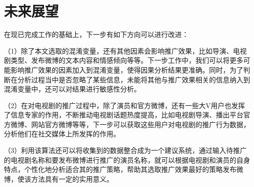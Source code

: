 \section{未来展望}

在现已完成工作的基础上，下一步有如下方向可以进行改进：

（1）除了本文选取的混淆变量，还有其他因素会影响推广效果，比如导演、电视剧类型、发布微博的文本内容和情感倾向等等。下一步工作中，我们可以将更多可能影响推广效果的因素加入到混淆变量，使得因果分析结果更准确。同时，为了判断在分析过程当中是否忽略了某些信息，未能将其他与推广效果相关的信息纳入到混淆变量中，还可以对结果进行敏感性分析。

（2）在对电视剧的推广过程中，除了演员和官方微博，还有一些大V用户也发挥了信息专家的作用，不断推动电视剧话题热度提高，比如电视剧导演、播出平台官方微博、网站官方微博等等，下一步可以获取这些用户对电视剧的推广行为数据，分析他们在社交媒体上所发挥的作用。

（3）利用该算法还可以将收集到的数据整合成为一个建议系统，通过输入待推广的电视剧名称和要发布微博进行推广的演员名称，就可以根据电视剧和演员的自身特点，个性化地分析适合其的推广策略，帮助其选取推广效果最好的策略发布微博，使该方法具有一定的实用意义。




